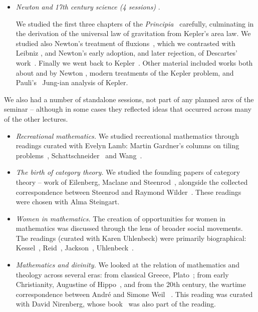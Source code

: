\begin{itemize}
 

 
\item {\em Newton and 17th century science (4 sessions) \/}.


  We studied the first three chapters of the {\em Principia\/}~\cite{newton_principia} carefully,
  culminating in the derivation of the universal law of gravitation from Kepler's area law. 
We studied also Newton's treatment of fluxions~\cite{newton_fluxions},  which we contrasted with Leibniz \cite{leibniz_new_method},
and  Newton's early adoption, and later rejection, of Descartes' work~\cite{descartes_geometrie}.
Finally we went back to Kepler~\cite{kepler_harmonice}. 
Other material included works both about and by Newton \cite{guicciardini, keynes_newton, newton_prophecies}, modern treatments
of the Kepler problem, and
Pauli's~\cite{pauli_kepler} Jung-ian analysis of Kepler.
\end{itemize}

We also had a number of standalone sessions, not part of any planned arcs of the seminar -- although in some cases
they reflected ideas that occurred across many of the other lectures.

\begin{itemize}
\item {\em Recreational mathematics. \/}   We studied recreational mathematics through
readings curated with Evelyn Lamb: Martin Gardner's columns on tiling problems~\cite{gardner_tessellating},
  Schattschneider~\cite{Schattschneider,schattschneider_tiling} and  Wang~\cite{wang_games}.
 

\item {\em The birth of category theory.\/} 
We studied the founding papers of category theory -- work of Eilenberg, Maclane and Steenrod~\cite{eilenberg_maclane_homomorphisms,eilenberg_maclane_extensions,eilenberg_maclane_equivalences, eilenberg_steenrod_axiomatic}, alongside the collected correspondence between Steenrod and Raymond Wilder~\cite{wilder_steenrod_letters}. These readings were chosen with Alma Steingart.

\item {\em Women in mathematics.\/}
 The creation of opportunities for women in mathematics was discussed through the lens of  broader social movements.
 The readings (curated with Karen Uhlenbeck) were primarily biographical:  
 Kessel~\cite{kessel_tenured_women}, Reid~\cite{reid_julia_robinson}, Jackson~\cite{jackson_miracle_group}, Uhlenbeck~\cite{uhlenbeck_glass_ceiling}.



\item {\em Mathematics and divinity.\/}  We looked at the relation of  mathematics and theology across several  eras: from classical Greece,  
Plato~\cite{plato_epinomis}; from early Christianity, Augustine of Hippo~\cite{augustine_free_choice}, and from the 20th century,
the wartime correspondence between Andr\'{e} and Simone Weil
~\cite{weil_correspondence}. This reading was curated with David Nirenberg, whose book~\cite{nirenberg_uncountable} was also part of the reading.
%


 \end{itemize}


